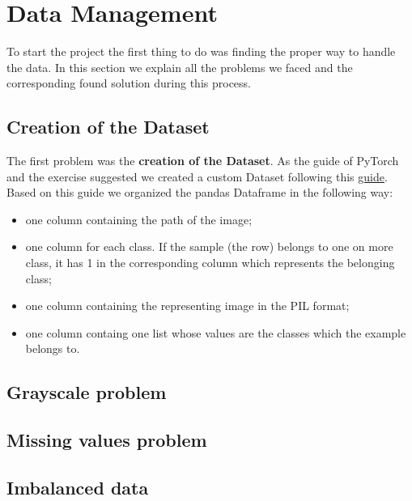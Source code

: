 \section{Data Management}
To start the project the first thing to do was finding the proper way to handle the data. In this section we explain all the problems we faced and the corresponding found solution during this process.

\subsection{Creation of the Dataset}
The first problem was the \textbf{creation of the Dataset}. As the guide of PyTorch and the exercise suggested we created a custom Dataset following this \href{https://github.com/utkuozbulak/pytorch-custom-dataset-examples}{guide}. Based on this guide we organized the pandas Dataframe in the following way:
\begin{itemize}
	\item one column containing the path of the image;
	\item one column for each class. If the sample (the row) belongs to one on more class, it has 1 in the corresponding column which represents the belonging class;
	\item one column containing the representing image in the PIL format;
	\item one column containg one list whose values are the classes which the example belongs to.
\end{itemize}

\subsection{Grayscale problem}

\subsection{Missing values problem}

\subsection{Imbalanced data}